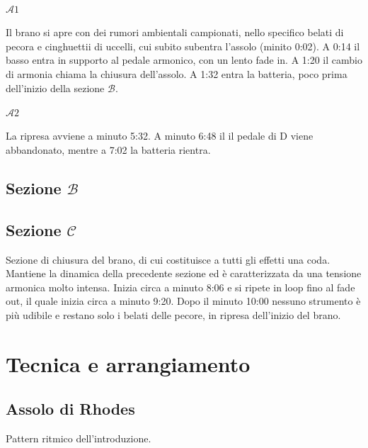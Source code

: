 \documentclass[class=book, crop=false, oneside, 12pt]{standalone}
\begin{document}
    
    \paragraph{\(\mathcal{A}1\)} 
    Il brano si apre con dei rumori ambientali campionati, nello specifico belati di pecora e cinghuettii di uccelli, cui subito  subentra l'assolo (minito 0:02). A 0:14 il basso entra in supporto al pedale armonico, con un lento fade in. A 1:20 il cambio di armonia chiama la chiusura dell'assolo. A 1:32 entra la batteria, poco prima dell'inizio della sezione \(\mathcal{B}\).

    \paragraph{\(\mathcal{A}2\)} 
    La ripresa avviene a minuto 5:32. A minuto 6:48 il il pedale di D viene abbandonato, mentre a 7:02 la batteria rientra.

    \subsection*{Sezione \(\mathcal{B}\)}

    
    \subsection*{Sezione \(\mathcal{C}\)}
    Sezione di chiusura del brano, di cui costituisce a tutti gli effetti una coda. Mantiene la dinamica della precedente sezione ed è caratterizzata da una tensione armonica molto intensa. Inizia circa a minuto 8:06 e si ripete in loop fino al fade out, il quale inizia circa a minuto 9:20. Dopo il minuto 10:00 nessuno strumento è più udibile e restano solo i belati delle pecore, in ripresa dell'inizio del brano.
    
    \section{Tecnica e arrangiamento}
    \label{sec:03-arrangement}

    \subsection{Assolo di Rhodes}

    \begin{sheet}[htbp]
        \centering
        \caption{Pattern ritmico dell'introduzione.}
        \label{sheet:sheep-epiano_solo}
    \end{sheet}
\end{document}
